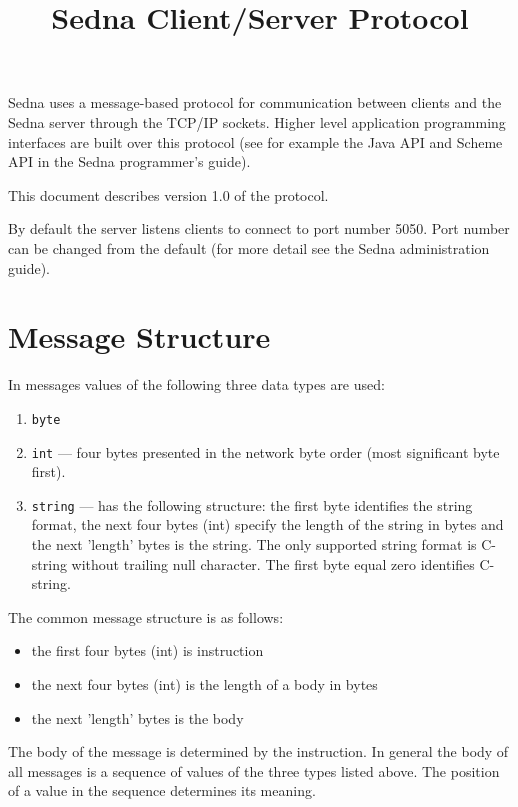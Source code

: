 \documentclass[a4paper,12pt]{article}
\title{Sedna Client/Server Protocol}
\date{}
\begin{document}
\maketitle
Sedna uses a message-based protocol for communication between clients and the Sedna server through the TCP/IP sockets. Higher level application programming interfaces are built over this protocol (see for example the Java API and Scheme API in the Sedna programmer's guide).

This document describes version 1.0 of the protocol. 

By default the server listens clients to connect to port number 5050. Port number can be changed from the default (for more detail see the Sedna administration guide).


\section{Message Structure}
In messages values of the following three data types are used:
\begin{enumerate}
\item \verb!byte!
\item \verb!int! --- four bytes presented in the network byte order (most significant byte first).
\item \verb!string! --- has the following structure: the first byte identifies the string format, the next four bytes (int) specify the length of the string in bytes and the next 'length' bytes is the string. The only supported string format is C-string without trailing null character. The first byte equal zero identifies C-string. 
\end{enumerate}

The common message structure is as follows:
\begin{itemize} 
\item the first four bytes (int) is instruction 
\item the next four bytes (int) is the length of a body in bytes
\item the next 'length' bytes is the body 
\end{itemize} 

The body of the message is determined by the instruction. In general the body of all messages is a sequence of values of the three types listed above. The position of a value in the sequence determines its meaning. 
\end{document}
